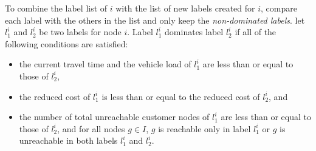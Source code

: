\begin{enumerate}
\begin{enumerate}
    To combine the label list of $i$ with the list of new labels created 
    for $i$, compare each label with the others in the list and only keep the 
    {\em non-dominated labels}. 
    let $l^i_1$ and $l^i_2$ be two labels for node $i$.  Label $l^i_1$ 
    dominates label $l^i_2$ if all of the following conditions are 
    satisfied: 
    \begin{itemize}
    \item[i.] the current travel time and the vehicle load 
      of $l^i_1$ are less than or equal to those of $l^i_2$,
    \item[ii.] the reduced cost of $l^i_1$ is less than or 
      equal to the reduced cost of $l^i_2$, and
    \item [iii.] the number of total unreachable customer nodes 
      of $l^i_1$ are less than or equal to those of $l^i_2$, and
      for all nodes $g \in I$, $g$ is reachable only in label 
      $l^i_1$ or $g$ is unreachable in both labels $l^i_1$ and  $l^i_2$. 
    \end{itemize}

\end{enumerate}
\end{enumerate}
